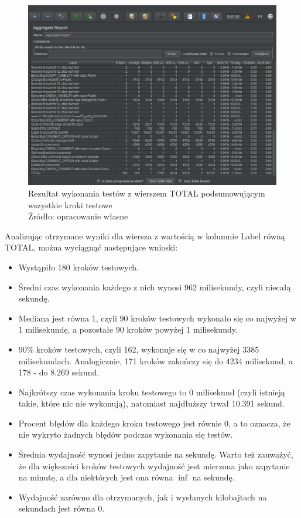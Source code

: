 \begin{figure}[H]
\centering
\captionsetup{justification=centering}
\includegraphics[width=1\textwidth]{Results2.PNG}
\caption[Rezultat wykonania testów z wierszem TOTAL podsumowującym wszystkie kroki testowe]{\label{fig:ham}Rezultat wykonania testów z wierszem TOTAL podsumowującym wszystkie kroki testowe  \\ Źródło: opracowanie własne}
\end{figure}

Analizując otrzymane wyniki dla wiersza z wartością w kolumnie Label równą TOTAL, można wyciągnąć następujące wnioski:
\begin{itemize}
    \item Wystąpiło 180 kroków testowych.
    \item Średni czas wykonania każdego z nich wynosi 962 milisekundy, czyli niecałą sekundę.
    \item Mediana jest równa 1, czyli 90 kroków testowych wykonało się co najwyżej w 1 milisekundę, a pozostałe 90 kroków powyżej 1 milisekundy.
    \item 90\% kroków testowych, czyli 162, wykonuje się w co najwyżej 3385 milisekundach. Analogicznie, 171 kroków zakończy się do 4234 milisekund, a 178 - do 8.269 sekund.
    \item Najkrótszy czas wykonania kroku testowego to 0 milisekund (czyli istnieją takie, które nic nie wykonują), natomiast najdłuższy trwał 10.391 sekund.
    \item Procent błędów dla każdego kroku testowego jest równie 0, a to oznacza, że nie wykryto żadnych błędów podczas wykonania się testów.
    \item Średnia wydajność wynosi jedno zapytanie na sekundę. Warto też zauważyć, że dla większości kroków testowych wydajność jest mierzona jako zapytanie na minutę, a dla niektórych jest ona równa $\inf$ na sekundę.
    \item Wydajność zarówno dla otrzymanych, jak i wysłanych kilobajtach na sekundach jest równa 0.
\end{itemize}


